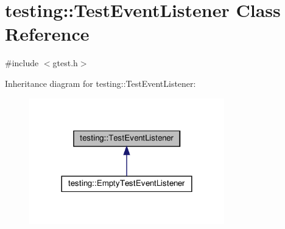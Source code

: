 \hypertarget{classtesting_1_1TestEventListener}{}\section{testing\+:\+:Test\+Event\+Listener Class Reference}
\label{classtesting_1_1TestEventListener}


{\ttfamily \#include $<$gtest.\+h$>$}



Inheritance diagram for testing\+:\+:Test\+Event\+Listener\+:\nopagebreak
\begin{figure}[H]
\begin{center}
\leavevmode
\includegraphics[width=240pt]{classtesting_1_1TestEventListener__inherit__graph}
\end{center}
\end{figure}
